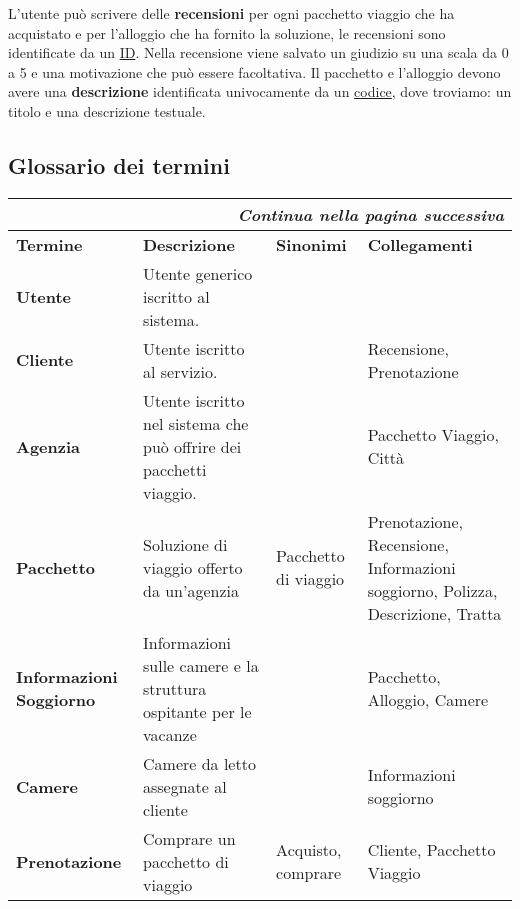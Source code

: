 %
%
L'utente può scrivere delle \textbf{recensioni} per ogni pacchetto viaggio che ha acquistato e per l'alloggio che ha fornito la soluzione, le recensioni sono identificate da un \underline{ID}. Nella recensione viene salvato un giudizio su una scala da 0 a 5 e una motivazione che può essere facoltativa.
%
%
Il pacchetto e l'alloggio devono avere una \textbf{descrizione} identificata univocamente da un \underline{codice}, dove troviamo: un titolo e una descrizione testuale.



\subsection{Glossario dei termini}
\begin{center}
    \begin{tabularx}{\textwidth}{p{} X >{\raggedright\arraybackslash}p{} >{\raggedright\arraybackslash}p{}}
        \caption{Dizionario termini}\\\toprule\endfirsthead
        \toprule\endhead
        \midrule\multicolumn{4}{r}{\itshape Continua nella pagina successiva}\\\midrule\endfoot
        \bottomrule\endlastfoot
        \textbf{Termine} & \textbf{Descrizione} & \textbf{Sinonimi} & \textbf{Collegamenti} \\
        \midrule
        \textbf{Utente} & Utente generico iscritto al sistema. & &
        \\\midrule
        \textbf{Cliente} & Utente iscritto al servizio. & & Recensione, Prenotazione
        \\\midrule
        \textbf{Agenzia} & Utente iscritto nel sistema che può offrire dei pacchetti viaggio. & & Pacchetto Viaggio, Città
        \\\midrule
        \textbf{Pacchetto} & Soluzione di viaggio offerto da un'agenzia & Pacchetto di viaggio & Prenotazione, Recensione, Informazioni soggiorno, Polizza, Descrizione, Tratta
        \\\midrule
        \textbf{Informazioni Soggiorno} & Informazioni sulle camere e la struttura ospitante per le vacanze & & Pacchetto, Alloggio, Camere
        \\\midrule
        \textbf{Camere} & Camere da letto assegnate al cliente & & Informazioni soggiorno
        \\\midrule
        \textbf{Prenotazione} & Comprare un pacchetto di viaggio & Acquisto, comprare & Cliente, Pacchetto Viaggio

\end{tabularx}
\end{center}
